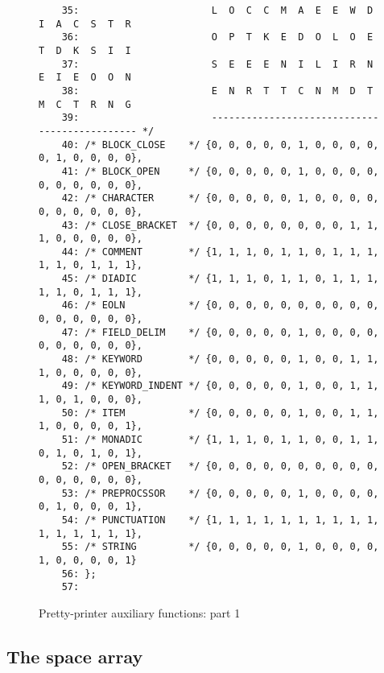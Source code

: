 \begin{figure}
\begin{minipage}{30cm}
\begin{verbatim}
    35:                       L  O  C  C  M  A  E  E  W  D  I  A  C  S  T  R
    36:                       O  P  T  K  E  D  O  L  O  E  T  D  K  S  I  I
    37:                       S  E  E  E  N  I  L  I  R  N  E  I  E  O  O  N
    38:                       E  N  R  T  T  C  N  M  D  T  M  C  T  R  N  G
    39:                       ---------------------------------------------- */
    40: /* BLOCK_CLOSE    */ {0, 0, 0, 0, 0, 1, 0, 0, 0, 0, 0, 1, 0, 0, 0, 0}, 
    41: /* BLOCK_OPEN     */ {0, 0, 0, 0, 0, 1, 0, 0, 0, 0, 0, 0, 0, 0, 0, 0}, 
    42: /* CHARACTER      */ {0, 0, 0, 0, 0, 1, 0, 0, 0, 0, 0, 0, 0, 0, 0, 0}, 
    43: /* CLOSE_BRACKET  */ {0, 0, 0, 0, 0, 0, 0, 0, 1, 1, 1, 0, 0, 0, 0, 0}, 
    44: /* COMMENT        */ {1, 1, 1, 0, 1, 1, 0, 1, 1, 1, 1, 1, 0, 1, 1, 1}, 
    45: /* DIADIC         */ {1, 1, 1, 0, 1, 1, 0, 1, 1, 1, 1, 1, 0, 1, 1, 1}, 
    46: /* EOLN           */ {0, 0, 0, 0, 0, 0, 0, 0, 0, 0, 0, 0, 0, 0, 0, 0}, 
    47: /* FIELD_DELIM    */ {0, 0, 0, 0, 0, 1, 0, 0, 0, 0, 0, 0, 0, 0, 0, 0}, 
    48: /* KEYWORD        */ {0, 0, 0, 0, 0, 1, 0, 0, 1, 1, 1, 0, 0, 0, 0, 0}, 
    49: /* KEYWORD_INDENT */ {0, 0, 0, 0, 0, 1, 0, 0, 1, 1, 1, 0, 1, 0, 0, 0}, 
    50: /* ITEM           */ {0, 0, 0, 0, 0, 1, 0, 0, 1, 1, 1, 0, 0, 0, 0, 1}, 
    51: /* MONADIC        */ {1, 1, 1, 0, 1, 1, 0, 0, 1, 1, 0, 1, 0, 1, 0, 1}, 
    52: /* OPEN_BRACKET   */ {0, 0, 0, 0, 0, 0, 0, 0, 0, 0, 0, 0, 0, 0, 0, 0}, 
    53: /* PREPROCSSOR    */ {0, 0, 0, 0, 0, 1, 0, 0, 0, 0, 0, 1, 0, 0, 0, 1}, 
    54: /* PUNCTUATION    */ {1, 1, 1, 1, 1, 1, 1, 1, 1, 1, 1, 1, 1, 1, 1, 1}, 
    55: /* STRING         */ {0, 0, 0, 0, 0, 1, 0, 0, 0, 0, 1, 0, 0, 0, 0, 1}
    56: }; 
    57: 
\end{verbatim}
\end{minipage}
\caption{Pretty-printer auxiliary functions: part 1}
\label{pr_c_aux.c:1}
\end{figure}

\subsection{The space array}

